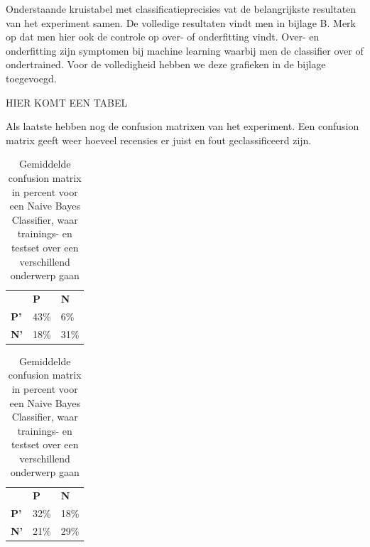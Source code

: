 Onderstaande kruistabel met classificatieprecisies vat de belangrijkste resultaten van het experiment samen. De volledige resultaten vindt men in bijlage B. Merk op dat men hier ook de controle op over- of onderfitting vindt. Over- en onderfitting zijn symptomen bij machine learning waarbij men de classifier over of ondertrained. Voor de volledigheid hebben we deze grafieken in de bijlage toegevoegd.    

HIER KOMT EEN TABEL

Als laatste hebben nog de confusion matrixen van het experiment. Een confusion matrix geeft weer hoeveel recensies er juist en fout geclassificeerd zijn. 

\begin{table}[h]
\centering
\setlength\tabcolsep{4pt}
\begin{minipage}[t]{0.48\textwidth}
\centering
\begin{tabular}{lll}
                                 & \textbf{P}               & \textbf{N}               \\ \cline{2-3} 
\multicolumn{1}{l|}{\textbf{P'}} & \multicolumn{1}{l|}{43\%} & \multicolumn{1}{l|}{6\%} \\ \cline{2-3} 
\multicolumn{1}{l|}{\textbf{N'}} & \multicolumn{1}{l|}{18\%} & \multicolumn{1}{l|}{31\%} \\ \cline{2-3} 
\end{tabular}
\caption{Gemiddelde confusion matrix in percent voor een Naive Bayes Classifier, waar trainings- en testset over hetzelfde onderwerp gaan}
\end{minipage}%
\hfill
\begin{minipage}[t]{0.48\textwidth}
\centering
\begin{tabular}{lll}
                                 & \textbf{P}               & \textbf{N}               \\ \cline{2-3} 
\multicolumn{1}{l|}{\textbf{P'}} & \multicolumn{1}{l|}{32\%} & \multicolumn{1}{l|}{18\%} \\ \cline{2-3} 
\multicolumn{1}{l|}{\textbf{N'}} & \multicolumn{1}{l|}{21\%} & \multicolumn{1}{l|}{29\%} \\ \cline{2-3} 
\end{tabular}
\caption{Gemiddelde confusion matrix in percent voor een Naive Bayes Classifier, waar trainings- en testset over een verschillend onderwerp gaan} 
\end{minipage}
\end{table}

